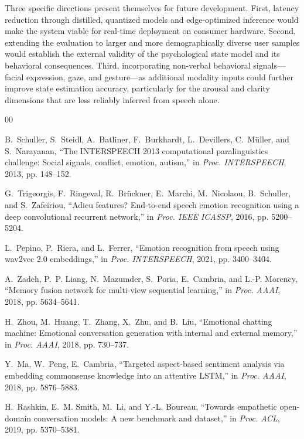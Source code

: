 \documentclass[conference]{IEEEtran}
\begin{document}
Three specific directions present themselves for future development. First, latency reduction through distilled, quantized models and edge-optimized inference would make the system viable for real-time deployment on consumer hardware. Second, extending the evaluation to larger and more demographically diverse user samples would establish the external validity of the psychological state model and its behavioral consequences. Third, incorporating non-verbal behavioral signals---facial expression, gaze, and gesture---as additional modality inputs could further improve state estimation accuracy, particularly for the arousal and clarity dimensions that are less reliably inferred from speech alone.

\begin{thebibliography}{00}

B.~Schuller, S.~Steidl, A.~Batliner, F.~Burkhardt, L.~Devillers, C.~Müller, and S.~Narayanan, ``The INTERSPEECH 2013 computational paralinguistics challenge: Social signals, conflict, emotion, autism,'' in \textit{Proc. INTERSPEECH}, 2013, pp. 148--152.

G.~Trigeorgis, F.~Ringeval, R.~Brückner, E.~Marchi, M.~Nicolaou, B.~Schuller, and S.~Zafeiriou, ``Adieu features? End-to-end speech emotion recognition using a deep convolutional recurrent network,'' in \textit{Proc. IEEE ICASSP}, 2016, pp. 5200--5204.

L.~Pepino, P.~Riera, and L.~Ferrer, ``Emotion recognition from speech using wav2vec 2.0 embeddings,'' in \textit{Proc. INTERSPEECH}, 2021, pp. 3400--3404.

A.~Zadeh, P.~P. Liang, N.~Mazumder, S.~Poria, E.~Cambria, and L.-P. Morency, ``Memory fusion network for multi-view sequential learning,'' in \textit{Proc. AAAI}, 2018, pp. 5634--5641.

H.~Zhou, M.~Huang, T.~Zhang, X.~Zhu, and B.~Liu, ``Emotional chatting machine: Emotional conversation generation with internal and external memory,'' in \textit{Proc. AAAI}, 2018, pp. 730--737.

Y.~Ma, W.~Peng, E.~Cambria, ``Targeted aspect-based sentiment analysis via embedding commonsense knowledge into an attentive LSTM,'' in \textit{Proc. AAAI}, 2018, pp. 5876--5883.

H.~Rashkin, E.~M. Smith, M.~Li, and Y.-L. Boureau, ``Towards empathetic open-domain conversation models: A new benchmark and dataset,'' in \textit{Proc. ACL}, 2019, pp. 5370--5381.


\end{thebibliography}
\end{document}
